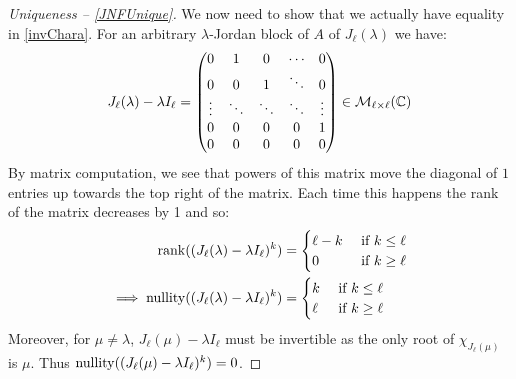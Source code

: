 \documentclass[../main.tex]{subfiles}
\begin{document}
\begin{proof}[Uniqueness -- \cref{JNFUnique}]
  We now need to show that we actually have equality in \cref{invChara}.
  For an arbitrary $\lambda$-Jordan block of $A$ of $J_{\ell}(\lambda)$ we have:
  \[
    J_{\ell}(\lambda) - \lambda I_{\ell} =
    \begin{pmatrix}
      0 & 1 & 0 & \cdots & 0 \\
      0 & 0 & 1 & \ddots & 0 \\
      \vdots & \ddots & \ddots & \ddots & \vdots \\
      0 & 0 & 0 & 0 & 1 \\
      0 & 0 & 0 & 0 & 0 \\
    \end{pmatrix} \in \mathcal{M}_{\ell \times \ell}(\mathbb{C})
  \]
  By matrix computation, we see that powers of this matrix  move the diagonal of $1$ entries up towards the top right of the matrix.
  Each time this happens the rank of the matrix decreases by 1 and so:
  \begin{align*}
    \operatorname{rank}((J_{\ell}(\lambda) - \lambda I_{\ell})^{k}) &= \begin{cases}
    \ell - k &  \text{ if } k \leq \ell \\
    0 & \text{ if } k \geq \ell
    \end{cases} \\
    \implies \operatorname{nullity}((J_{\ell}(\lambda) - \lambda I_{\ell})^{k}) &= \begin{cases}
    k & \text{ if } k \leq \ell \\
    \ell & \text{ if } k \geq \ell
    \end{cases}
  \end{align*}
  Moreover, for $\mu \neq \lambda$, $J_{\ell}(\mu) - \lambda I_{\ell}$ must be invertible as the only root of $\chi_{J_{\ell}(\mu)}$ is $\mu$.
  Thus $\operatorname{nullity}((J_{\ell}(\mu) - \lambda I_{\ell})^k) = 0$.


\end{proof}
\end{document}
